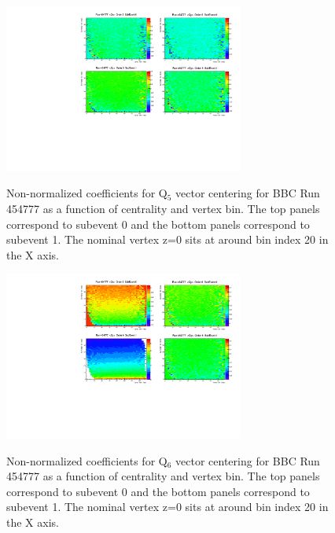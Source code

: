 \documentclass{article}
\begin{document}
\begin{figure}
\centering
\includegraphics[width=0.7\textwidth]{fig_eventplane/QC_454777_ORD4.pdf}
\label{fig.bbc.qc4}
\caption{Non-normalized coefficients for Q$_5$ vector centering for BBC Run 454777 as a function of centrality and vertex bin. The top panels correspond to subevent 0 and the bottom panels correspond to subevent 1. The nominal vertex z=0 sits at around bin index 20 in the X axis.}
\end{figure}
\begin{figure}
\centering
\includegraphics[width=0.7\textwidth]{fig_eventplane/QC_454777_ORD5.pdf}
\label{fig.bbc.qc5}
\caption{Non-normalized coefficients for Q$_6$ vector centering for BBC Run 454777 as a function of centrality and vertex bin. The top panels correspond to subevent 0 and the bottom panels correspond to subevent 1. The nominal vertex z=0 sits at around bin index 20 in the X axis.}
\end{figure}
\end{document}
